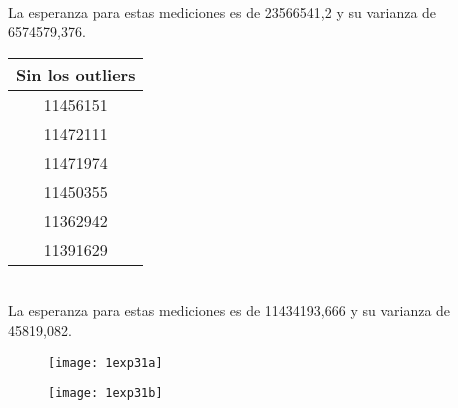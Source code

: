 ﻿\documentclass[a4paper]{article}
\begin{document}
\ \\
La esperanza para estas mediciones es de 23566541,2 y su varianza de 6574579,376.
\ \\
\begin{center}
  \begin{tabular}{| c |}
    \hline
    Sin los outliers\\ 
    \hline\hline
    11456151\\ 
    \hline
    11472111\\ 
    \hline
    11471974\\ 
    \hline
    11450355\\ 
    \hline
    11362942\\ 
    \hline
    11391629\\ 
    \hline
  \end{tabular}
\end{center}
\ \\
La esperanza para estas mediciones es de 11434193,666 y su varianza de 45819,082.


\begin{figure}[h]
  \centering
    \texttt{[image: 1exp31a]}
\end{figure}

\begin{figure}[h]
  \centering
    \texttt{[image: 1exp31b]}
\end{figure}
\end{document}
